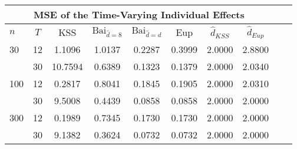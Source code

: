 \begin{tabular}{lccccccccc} 
\hline \multicolumn{8}{c}{MSE of the Time-Varying Individual Effects} \\ \hline 
$n$ & $T$ & KSS & $ \text{Bai}_{\hat{d} = 8}$ & $\text{Bai}_{\hat{d} = d}$ & Eup & $\hat{d}_{KSS}$ & $\hat{d}_{Eup}$ \\
\hline
30 & 12 &  1.1096  &  1.0137  &  0.2287  &  0.3999  &  2.0000  &  2.8800  \\
& 30 &  10.7594  &  0.6389  &  0.1323  &  0.1379  &  2.0000  &  2.0340  \\
100 & 12 &  0.2817  &  0.8041  &  0.1845  &  0.1905  &  2.0000  &  2.0310  \\
& 30 &  9.5008  &  0.4439  &  0.0858  &  0.0858  &  2.0000  &  2.0000  \\
300 & 12 &  0.1989  &  0.7345  &  0.1730  &  0.1730  &  2.0000  &  2.0000  \\
& 30 &  9.1382  &  0.3624  &  0.0732  &  0.0732  &  2.0000  &  2.0000  \\
\end{tabular} 
